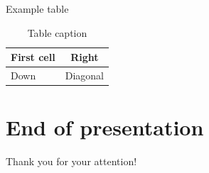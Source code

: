 \documentclass[12pt,aspectratio=169]{beamer}
\begin{document}
\begin{frame}{}

Example table

\begin{table}[H]
\large
\centering
\caption{Table caption}
\begin{tabular}[H]{|l|c|}
\hline
First cell & Right \\ \hline
Down & Diagonal \\ \hline
\end{tabular}
\end{table}
\end{frame}

\section{End of presentation}
\begin{frame}
\centering
\Huge Thank you for your attention!
\end{frame}

\end{document}
